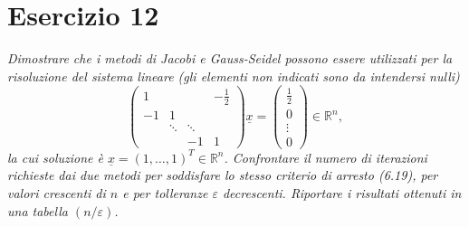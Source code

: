 \section{Esercizio 12}
\label{sub:es12}
\emph{Dimostrare che i metodi di Jacobi e Gauss-Seidel possono essere utilizzati per la risoluzione del sistema lineare (gli elementi non indicati sono da intendersi nulli)
			\[
				\begin{pmatrix}
					1 & & & -\frac{1}{2}\\
					-1 & 1 & &\\
					& \ddots & \ddots &\\
					& & -1 & 1
				\end{pmatrix}\underline{x}=\begin{pmatrix}
					\frac{1}{2}\\
					0\\
					\vdots\\
					0
				\end{pmatrix}\in\mathbb{R}^n,
			\]
			la cui soluzione è $\underline{x}=(1,\dots,1)^T\in\mathbb{R}^n$.
      Confrontare il numero di iterazioni richieste dai due metodi per soddisfare lo stesso criterio di arresto (6.19),
      per valori crescenti di $n$ e per tolleranze $\varepsilon$ decrescenti. Riportare i risultati ottenuti in una tabella $(n/\varepsilon)$.
      }
